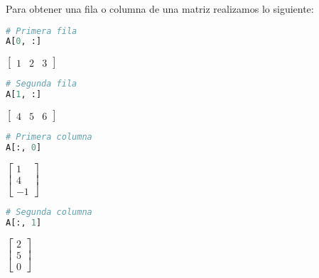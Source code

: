 \documentclass[a4,11pt]{aleph-notas}
\begin{document}
Para obtener una fila o columna de una matriz realizamos lo siguiente:
\begin{pycodigo}
    \begin{ipynbcodigo}\begin{lstlisting}[language=Python]
# Primera fila
A[0, :]
    \end{lstlisting}\end{ipynbcodigo}
    \begin{ipynbsalida}[2mm]
        $\displaystyle \left[\begin{matrix}1 & 2 & 3\end{matrix}\right]$
    \end{ipynbsalida}
    \begin{ipynbcodigo}\begin{lstlisting}[language=Python]
# Segunda fila
A[1, :]
    \end{lstlisting}\end{ipynbcodigo}
    \begin{ipynbsalida}[2mm]
        $\displaystyle \left[\begin{matrix}4 & 5 & 6\end{matrix}\right]$
    \end{ipynbsalida}
    \begin{ipynbcodigo}\begin{lstlisting}[language=Python]
# Primera columna
A[:, 0]
    \end{lstlisting}\end{ipynbcodigo}
    \begin{ipynbsalida}[2mm]
        $\displaystyle \left[\begin{matrix}1\\4\\-1\end{matrix}\right]$
    \end{ipynbsalida}
    \begin{ipynbcodigo}\begin{lstlisting}[language=Python]
# Segunda columna
A[:, 1]
    \end{lstlisting}\end{ipynbcodigo}
    \begin{ipynbsalida}[2mm]
        $\displaystyle \left[\begin{matrix}2\\5\\0\end{matrix}\right]$
    \end{ipynbsalida}
\end{pycodigo}
\end{document}
